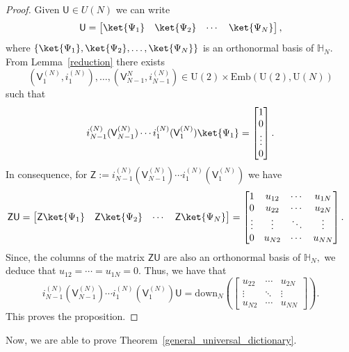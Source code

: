 \documentclass[a4paper,11pt]{article}
\newcommand{\rU}{\mathsf{U}}
\newcommand{\rV}{\mathsf{V}}
\newcommand{\rZ}{\mathsf{Z}}
\begin{document}
\begin{appendices}
    \begin{proof}
  Given $\rU \in U(N)$ we can write
    $$
    \rU = \begin{bmatrix}
      \ket{\Psi_1} & \ket{\Psi_2} & \cdots  & \ket{\Psi_N}
    \end{bmatrix},
    $$
    where $\{\ket{\Psi_1},\ket{\Psi_2},\ldots ,\ket{\Psi_N}\}$ is an orthonormal basis of $\mathbb{H}_N.$ From Lemma~\ref{reduction}
    there exists 
    $$
    (\rV_1^{(N)},i_1^{(N)}),\ldots,(\rV_{N-1}^{N},i_{N-1}^{(N)}) \in \mathrm{U}(2)  \times \mathrm{Emb}(\mathrm{U}(2),\mathrm{U}(N))
    $$ 
    such that
      $$
      i_{N-1}^{(N)}(\rV_{N-1}^{(N)}) \cdots i_1^{(N)}(\rV_1^{(N)})  \ket{\Psi_1} =  \begin{bmatrix} 1 \\ 0 \\ \vdots \\ 0 \end{bmatrix}.
      $$
    In consequence, for $\rZ:= i_{N-1}^{(N)}(\rV_{N-1}^{(N)}) \cdots i_1^{(N)}(\rV_1^{(N)})$ we have
    \begin{align*}
    \rZ \rU  & = \begin{bmatrix}
      \rZ \ket{\Psi_1} &  \rZ \ket{\Psi_2} & \cdots  & \rZ \ket{\Psi_N}
    \end{bmatrix} =
    \begin{bmatrix}
    1 & u_{12} & \cdots & u_{1N} \\
    0 & u_{22} & \cdots & u_{2N} \\
    \vdots & \vdots & \ddots & \vdots \\
    0 & u_{N2} & \cdots & u_{NN}
    \end{bmatrix}.
  \end{align*}
    Since, the columns of the matrix $\rZ \rU$ are also an orthonormal basis of $\mathbb{H}_N,$ we deduce that
    $u_{12}= \cdots =u_{1N} =0.$ Thus, we have that
    $$
    i_{N-1}^{(N)}(\rV_{N-1}^{(N)}) \cdots i_1^{(N)}(\rV_1^{(N)})  \rU = \mathrm{down}_N\left(\begin{bmatrix}
      u_{22} & \cdots & u_{2N} \\
       \vdots & \ddots & \vdots \\
      u_{N2} & \cdots & u_{NN}
      \end{bmatrix}\right).
    $$
    This proves the proposition.
  \end{proof}
  
  \bigskip
  
  Now, we are able to prove Theorem~\ref{general_universal_dictionary}.
  

\end{appendices}
\end{document}

